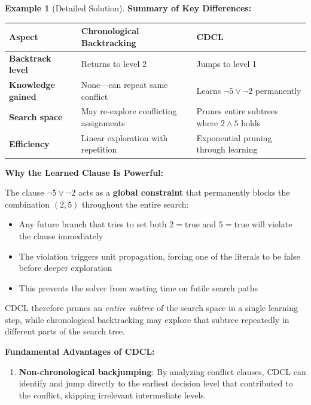 \documentclass[11pt,a4paper]{article}
\theoremstyle{definition}
\newtheorem{example}{Example}[section]
\theoremstyle{plain}
\theoremstyle{remark}
\begin{document}
\begin{example}[Detailed Solution]
\textbf{Summary of Key Differences:}

\begin{center}
\begin{tabular}{|p{4cm}|p{5cm}|p{5cm}|}
\hline
\textbf{Aspect} & \textbf{Chronological Backtracking} & \textbf{CDCL} \\
\hline
\textbf{Backtrack level} & Returns to level 2 & Jumps to level 1 \\
\hline
\textbf{Knowledge gained} & None—can repeat same conflict & Learns $\neg 5 \lor \neg 2$ permanently \\
\hline
\textbf{Search space} & May re-explore conflicting assignments & Prunes entire subtrees where $2 \land 5$ holds \\
\hline
\textbf{Efficiency} & Linear exploration with repetition & Exponential pruning through learning \\
\hline
\end{tabular}
\end{center}

\vspace{0.5em}

\textbf{Why the Learned Clause Is Powerful:}

The clause $\neg 5 \lor \neg 2$ acts as a \textbf{global constraint} that permanently blocks the combination $(2,5)$ throughout the entire search:
\begin{itemize}
    \item Any future branch that tries to set both $2 = \text{true}$ and $5 = \text{true}$ will violate the clause immediately
    \item The violation triggers unit propagation, forcing one of the literals to be false before deeper exploration
    \item This prevents the solver from wasting time on futile search paths
\end{itemize}

CDCL therefore prunes an \textit{entire subtree} of the search space in a single learning step, while chronological backtracking may explore that subtree repeatedly in different parts of the search tree.

\textbf{Fundamental Advantages of CDCL:}
\begin{enumerate}
    \item \textbf{Non-chronological backjumping}: By analyzing conflict clauses, CDCL can identify and jump directly to the earliest decision level that contributed to the conflict, skipping irrelevant intermediate levels.
    

\end{enumerate}
\end{example}
\end{document}
